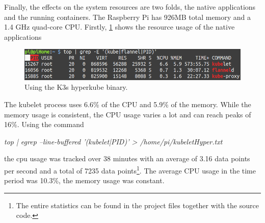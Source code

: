 Finally, the effects on the system resources are two folds, the native applications and the running containers. The Raspberry Pi has 926MB total memory and a 1.4 GHz quad-core CPU. Firstly, \cref{fig:kubernetesResourceConsumption} shows the resource usage of the native applications
\begin{figure}[h!]
    \centering
    \includegraphics[scale=0.5]{figures/kubernetesResourceConsumption.png}
    \vspace*{-0.3cm}
    \caption[The Resource Usage of native Kubernetes Components.]{Using the K3s hyperkube binary.}
    \label{fig:kubernetesResourceConsumption}
\end{figure}
The kubelet process uses 6.6\% of the CPU and 5.9\% of the memory. While the memory usage is consistent, the CPU usage varies a lot and can reach peaks of 16\%. Using the command
\begin{displayquote}
\textit{top | egrep --line-buffered '(kubelet|PID)' > /home/pi/kubeletHyper.txt }
\end{displayquote}
the cpu usage was tracked over 38 minutes with an average of 3.16 data points per second and a total of 7235 data points\footnote{The entire statistics can be found in the project files together with the source code.}. The average CPU usage in the time period was 10.3\%, the memory usage was constant.

